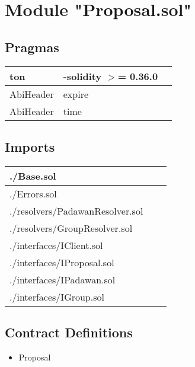 
\section{Module "Proposal.sol"}


\subsection{Pragmas}


\noindent\begin{tabular}{|l|l|p{5cm}|}\hline
ton & -solidity $>$= 0.36.0 &\\\hline
AbiHeader &  expire &\\\hline
AbiHeader &  time &\\\hline
\end{tabular}


\subsection{Imports}


\noindent\begin{tabular}{|l|l|p{5cm}|}\hline
./Base.sol &\\\hline
./Errors.sol &\\\hline
./resolvers/PadawanResolver.sol &\\\hline
./resolvers/GroupResolver.sol &\\\hline
./interfaces/IClient.sol &\\\hline
./interfaces/IProposal.sol &\\\hline
./interfaces/IPadawan.sol &\\\hline
./interfaces/IGroup.sol &\\\hline
\end{tabular}


\subsection{Contract Definitions}

\begin{itemize}
\item Proposal
\end{itemize}
